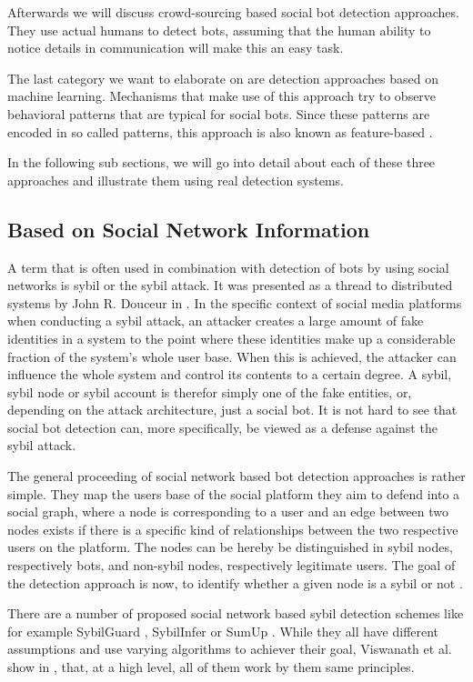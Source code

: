 Afterwards we will discuss crowd-sourcing based social bot detection approaches. They use actual humans to detect bots, assuming that the human ability to notice details in communication will make this an easy task.

The last category we want to elaborate on are detection approaches based on machine learning. Mechanisms that make use of this approach try to observe behavioral patterns that are typical for social bots. Since these patterns are encoded in so called patterns, this approach is also known as feature-based \cite{ferrara15}. %


In the following sub sections, we will go into detail about each of these three approaches and illustrate them using real detection systems.

\subsection{Based on Social Network Information}
A term that is often used in combination with detection of bots by using social networks is sybil or the sybil attack. It was presented as a thread to distributed systems by John R. Douceur in \cite{sybil}. In the specific context of social media platforms when conducting a sybil attack, an attacker creates a large amount of fake identities in a system to the point where these identities make up a considerable fraction of the system's whole user base. When this is achieved, the attacker can influence the whole system and control its contents to a certain degree. A sybil, sybil node or sybil account is therefor simply one of the fake entities, or, depending on the attack architecture, just a social bot. It is not hard to see that social bot detection can, more specifically, be viewed as a defense against the sybil attack.   

The general proceeding of social network based bot detection approaches is rather simple. They map the users base of the social platform they aim to defend into a social graph, where a node is corresponding to a user and an edge between two nodes exists if there is a specific kind of relationships between the two respective users on the platform. The nodes can be hereby be distinguished in sybil nodes, respectively bots, and non-sybil nodes, respectively legitimate users. The goal of the detection approach is now, to identify whether a given node is a sybil or not \cite{comparison}.

There are a number of proposed social network based sybil detection schemes like for example SybilGuard \cite{sybilguard}, SybilInfer \cite{sybilinfer} or SumUp \cite{sumup}. While they all have different assumptions and use varying algorithms to achiever their goal, Viswanath et al. show in \cite{comparison}, that, at a high level, all of them work by them same principles.

